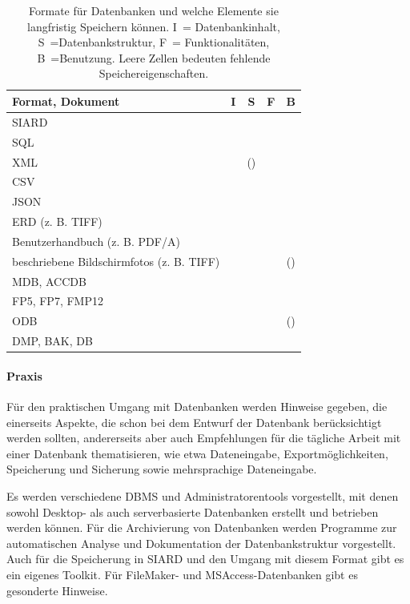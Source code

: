 \begin{table}[hbt]
\centering
\footnotesize
\begin{tabular}{R{0.4\textwidth} cccc}
	\toprule
	Format, Dokument	& I & S & F & B \\
	\midrule
	SIARD & \checkmark & \checkmark & \checkmark & \\
	SQL & \checkmark & \checkmark & \checkmark &  \\
	XML & \checkmark & (\checkmark) &  &  \\
	CSV & \checkmark & & & \\
	JSON & \checkmark & & & \\
	\midrule
	ERD (z. B. TIFF) & & & \checkmark &  \\
	Benutzerhandbuch (z. B. PDF/A) & & & & \checkmark \\
	beschriebene Bildschirmfotos (z. B. TIFF) & & & &  (\checkmark)\\
	\midrule
	MDB, ACCDB & & & &  \\
	FP5, FP7, FMP12 & & & &  \\
	ODB & & & & (\checkmark) \\
	DMP, BAK, DB & & & &  \\
	\bottomrule 
\end{tabular}
\caption{Formate für Datenbanken und welche Elemente sie langfristig Speichern können. I~= Datenbankinhalt, S~=Datenbankstruktur, F~= Funktionalitäten, B~=Benutzung. Leere Zellen bedeuten fehlende Speichereigenschaften.}
\label{tab:datenbanken-Eigenschaften}
\end{table}



\paragraph{Praxis}
Für den praktischen Umgang mit Datenbanken werden Hinweise gegeben, die einerseits Aspekte, die schon bei dem Entwurf der Datenbank berücksichtigt werden sollten, andererseits aber auch Empfehlungen für die tägliche Arbeit mit einer Datenbank thematisieren, wie etwa Dateneingabe, Exportmöglichkeiten, Speicherung und Sicherung sowie mehrsprachige Dateneingabe.

Es werden verschiedene DBMS und Administratorentools vorgestellt, mit denen sowohl Desktop- als auch serverbasierte Datenbanken erstellt und betrieben werden können. Für die Archivierung von Datenbanken werden Programme zur automatischen Analyse und Dokumentation der Datenbankstruktur vorgestellt. Auch für die Speicherung in SIARD und den Umgang mit diesem Format gibt es ein eigenes Toolkit. Für FileMaker- und MSAccess-Datenbanken gibt es gesonderte Hinweise.

